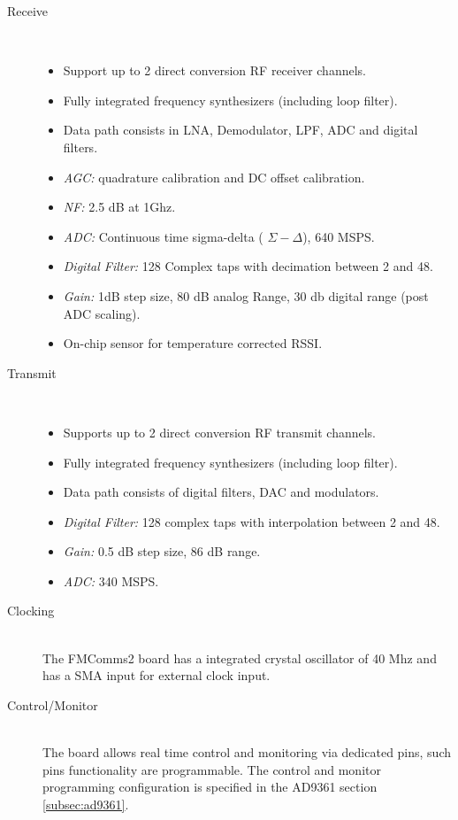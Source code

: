 \begin{description}
	\item[Receive] \hfill \\
	\begin{itemize}
		\item Support up to 2 direct conversion RF receiver channels.
		\item Fully integrated frequency synthesizers (including loop filter).
		\item Data path consists in LNA, Demodulator, LPF, ADC and digital filters.
		\item \textit{AGC:} quadrature calibration and DC offset calibration.
		\item \textit{NF:} 2.5 dB at 1Ghz.
		\item \textit{ADC:} Continuous time sigma-delta ( $\Sigma - \Delta$), 640 MSPS.
		\item \textit{Digital Filter:} 128 Complex taps with decimation between 2 and 48.
		\item \textit{Gain:} 1dB step size, 80 dB analog Range, 30 db digital range (post ADC scaling).
		\item On-chip sensor for temperature corrected RSSI.
	\end{itemize}

	\item[Transmit] \hfill \\
\begin{itemize}
		\item Supports up to 2 direct conversion RF transmit channels.
		\item Fully integrated frequency synthesizers (including loop filter).
\item Data path consists of digital filters, DAC and modulators.
		\item \textit{Digital Filter:} 128 complex taps with interpolation between 2 and 48.
		\item \textit{Gain:} 0.5 dB step size, 86 dB range.
		\item \textit{ADC:} 340 MSPS.
	\end{itemize}

	\item[Clocking] \hfill \\
		The FMComms2 board has a integrated crystal oscillator of 40 Mhz and has a SMA
input for external clock input.

	\item[Control/Monitor] \hfill \\
		The board allows real time control and monitoring via dedicated pins, such pins
functionality are programmable. The control and monitor programming
configuration is specified in the AD9361 section \ref{subsec:ad9361}.

\end{description}

